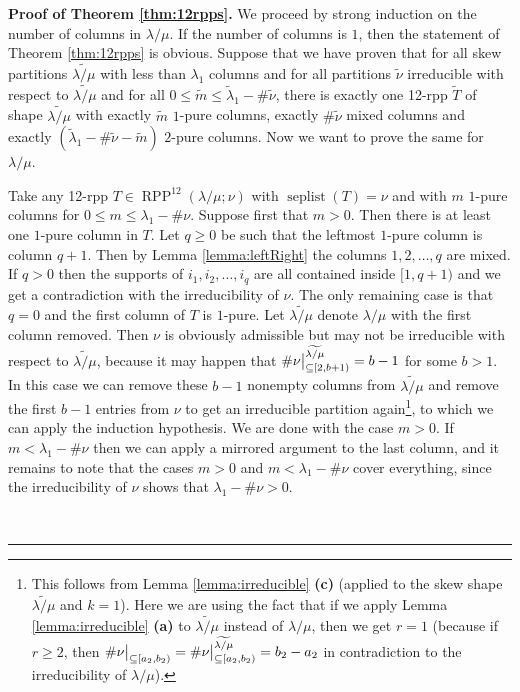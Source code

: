 \documentclass[12pt]{article}
\theoremstyle{plain}
\theoremstyle{definition}
\newenvironment{proof}[1][Proof]{\noindent\textbf{#1.} }{\ \rule{0.5em}{0.5em}}
\def\seplist{{\operatorname{seplist}}} %
\def\seplistvar{{{\nu}}} %
\def\lm{{\lambda/\mu}}
\def\OneTwoRPPCutvar{{\operatorname{RPP}^{12}\left(  \lambda/\mu ;\seplistvar \right)}}
\begin{document}
\begin{proof}[Proof of Theorem \ref{thm:12rpps}]
We proceed by strong induction on the number of columns in $\lm$. If the number of columns is $1$, then the statement of Theorem \ref{thm:12rpps} is obvious. Suppose that we have proven that for all skew partitions $\widetilde{\lm}$ with less than $\lambda_1$ columns and for all partitions $\widetilde\seplistvar$  irreducible with respect to $\widetilde{\lm}$ and for all $0\leq \widetilde m\leq \widetilde{\lambda}_1-\#\widetilde\seplistvar$, there is exactly one 12-rpp $\widetilde T$ of shape $\widetilde{\lm}$ with exactly $\widetilde m$ $1$-pure columns, exactly $\#\widetilde\seplistvar$ mixed columns and exactly $(\widetilde{\lambda}_1-\#\widetilde\seplistvar-\widetilde m)$ $2$-pure columns. Now we want to prove the same for $\lm$.

Take any 12-rpp $T\in\OneTwoRPPCutvar$ with $\seplist(T)=\seplistvar$ and with $m$ $1$-pure columns for $0\leq m\leq \lambda_1-\#\seplistvar$. Suppose first that $m>0$. Then there is at least one $1$-pure column in $T$. Let $q\geq 0$ be such that the leftmost $1$-pure column is column $q+1$. Then by Lemma \ref{lemma:leftRight} the columns $1,2,\dots,q$ are mixed. If $q>0$ then the supports of $i_1,i_2,\dots,i_q$ are all contained inside $[1,q+1)$ and we get a contradiction with the irreducibility of $\seplistvar$. The only remaining case is that $q=0$ and the first column of $T$ is $1$-pure. Let $\widetilde\lm$ denote $\lm$ with the first column removed. Then $\seplistvar$ is obviously admissible but may not be irreducible with respect to $\widetilde{\lm}$, because it may happen that $\#\nuxy{2}{b+1}^{\widetilde{\lm}}=b-1$
for some $b>1$. In this case we can remove these $b-1$ nonempty columns from $\widetilde{\lm}$ and remove the first $b-1$ entries from $\nu$ to get an irreducible partition again\footnote{This follows from Lemma \ref{lemma:irreducible} \textbf{(c)} (applied to the skew shape $\widetilde{\lm}$ and $k=1$). Here we are using the fact that if we apply Lemma \ref{lemma:irreducible} \textbf{(a)} to $\widetilde{\lm}$ instead of $\lm$, then we get $r = 1$ (because if $r \geq 2$, then $\#\nuxy{a_2}{b_2} = \#\nuxy{a_2}{b_2}^{\widetilde{\lm}} = b_2-a_2$ in contradiction to the irreducibility of $\lm$).}, to which we can apply the induction hypothesis. We are done with the case $m>0$. If $m<\lambda_1-\#\seplistvar$ then we can apply a mirrored argument to the last column, and it remains to note that the cases $m>0$ and $m<\lambda_1-\#\seplistvar$ cover everything, since the irreducibility of $\nu$ shows that $\lambda_1-\#\seplistvar>0$.


\end{proof}
\end{document}
